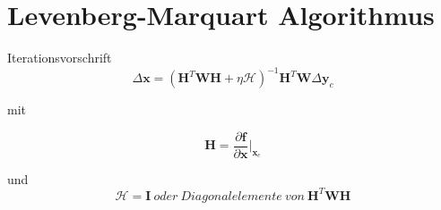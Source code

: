 \documentclass[8pt, t, aspectratio=169,%
]{beamer}
\begin{document}
\section{Levenberg-Marquart Algorithmus}

\begin{frame}{Iterationsvorschrift} \LARGE
	\begin{equation}
		\Delta\textbf{x}=(\textbf{H}^T \textbf{W} \textbf{H}+\eta \mathcal{H})^{-1}\textbf{H}^T \textbf{W} \Delta \textbf{y}_c
	\end{equation}


mit

\begin{equation}
	\textbf{H} =  \frac{\partial \textbf{f}}{\partial \textbf{x}}\big|_{\textbf{x}_c}
\end{equation}

und
\begin{equation}
	\mathcal{H} = \textbf{I} \: oder \: Diagonalelemente \: von \: \textbf{H}^T\textbf{WH}
\end{equation}
	
\end{frame}
\end{document}
